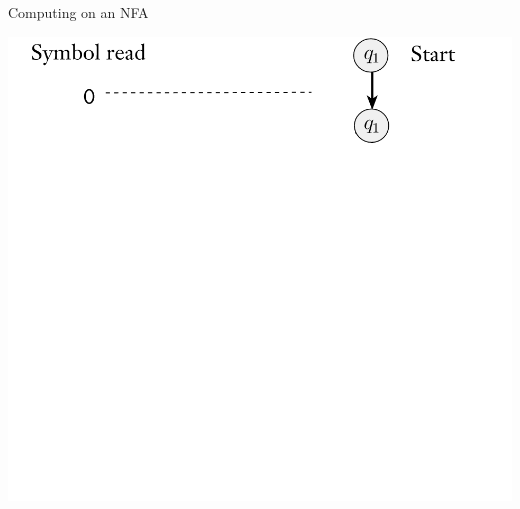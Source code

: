 \documentclass[aspectratio=169]{beamer}
\begin{document}
\begin{frame}{Computing on an NFA}
    \begin{center}
        \includegraphics[scale=0.80]{N1_compute/N1_1.png}
    \end{center}
\end{frame}
\end{document}

